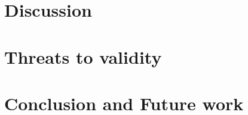 \documentclass[review]{elsarticle}
\begin{document}
	 \section{Discussion}
     \label{sec:discussion}
     
     
     	
  	\section{Threats to validity}
   	\label{sec:threats_to_validity}
   	
	
	 \section{Conclusion and Future work}
	 \label{sec:conclusion}
	 
	
	
\end{document}
